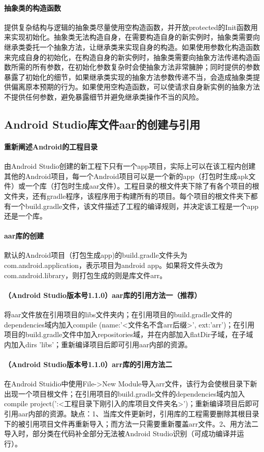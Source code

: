 \documentclass[UTF8]{ctexart}
\begin{document}
    \paragraph{抽象类的构造函数}
    提供复杂结构与逻辑的抽象类尽量使用空构造函数，并开放protected的Init函数用来实现初始化。抽象类无法构造自身，在需要构造自身的新实例时，抽象类需要向继承类委托一个抽象方法，让继承类来实现自身的构造。如果使用参数化构造函数来完成自身的初始化，在构造自身的新实例时，抽象类需要向抽象方法传递构造函数所需的所有参数，在初始化参数复杂时会使抽象方法非常臃肿；同时提供的参数暴露了初始化的细节，如果继承类实现的抽象方法参数传递不当，会造成抽象类提供偏离原本预期的行为。如果使用空构造函数，可以使请求自身新实例的抽象方法不提供任何参数，避免暴露细节并避免继承类操作不当的风险。
    \subsection{Android Studio库文件aar的创建与引用}
    \paragraph{重新阐述Android的工程目录}
    由Android Studio创建的新工程下只有一个app项目，实际上可以在该工程内创建其他的Android项目，每一个Android项目可以是一个新的app（打包时生成apk文件）或一个库（打包时生成aar文件）。工程目录的根文件夹下除了有各个项目的根文件夹，还有gradle程序，该程序用于构建所有的项目。每个项目的根文件夹下都有一个build.gradle文件，该文件描述了工程的编译规则，并决定该工程是一个app还是一个库。
    \paragraph{aar库的创建}
    默认的Android项目（打包生成app)的build.gradle文件头为com.android.application，表示项目为android app。如果将文件头改为com.android.library，则打包生成的则是库文件arr。
    \paragraph{（Android Studio版本号1.1.0）aar库的引用方法一（推荐）}
    将aar文件放在引用项目的libs文件夹内；在引用项目的build.gradle文件的dependencies域内加入compile (name:'<文件名不含arr后缀>', ext:'arr')；在引用项目的build.gradle文件中加入repositories域，并在内部加入flatDir子域，在子域内加入dirs 'libs'；重新编译项目后即可引用aar内部的资源。
    \paragraph{（Android Studio版本号1.1.0）arr库的引用方法二}
    在Android Stuidio中使用File->New Module导入arr文件，该行为会使根目录下新出现一个项目根文件；在引用项目的build.gradle文件的dependencies域内加入compile project(':<工程目录下刚引入的库项目文件夹名>')；重新编译项目后即可引用aar内部的资源。缺点：1、当库文件更新时，引用库的工程需要删除其根目录下的被引用项目文件再重新导入；而方法一只需要重新覆盖arr文件。2、用方法二导入时，部分类在代码补全部分无法被Android Studio识别（可成功编译并运行）。
\end{document}
